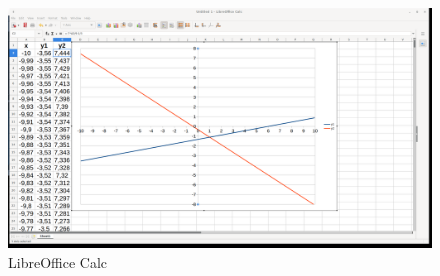 \begin{figure}[h!]		
	\centering
   	\includegraphics[width=8.0in]{pictures/picture_023.png}
  	\caption{LibreOffice Calc}
   	\label{fig:LibreOfficeCalc023}
\end{figure}